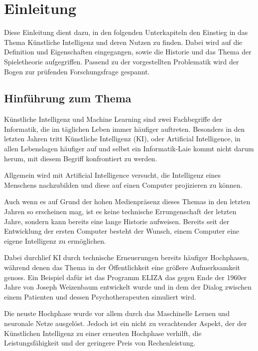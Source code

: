 
\chapter{Einleitung}
Diese Einleitung dient dazu, in den folgenden Unterkapiteln den Einstieg in das Thema Künstliche Intelligenz und deren Nutzen zu finden. Dabei wird auf die Definition und Eigenschaften eingegangen, sowie die Historie und das Thema der Spieletheorie aufgegriffen. Passend zu der vorgestellten Problematik wird der Bogen zur prüfenden Forschungsfrage gespannt.

\section{Hinführung zum Thema}
Künstliche Intelligenz und Machine Learning sind zwei Fachbegriffe der Informatik, die im täglichen Leben immer häufiger auftreten. Besonders in den letzten Jahren tritt Künstliche Intelligenz (\acs{KI}), oder Artificial Intelligence, in allen Lebenslagen häufiger auf und selbst ein Informatik-Laie kommt nicht darum herum, mit diesem Begriff konfrontiert zu werden. 

Allgemein wird mit Artificial Intelligence versucht, die Intelligenz eines Menschens nachzubilden und diese auf einen Computer projizieren zu können.

Auch wenn es auf Grund der hohen Medienpräsenz dieses Themas in den letzten Jahren so erscheinen mag, ist es keine technische Errungenschaft der letzten Jahre, sondern kann bereits eine lange Historie aufweisen. Bereits seit der Entwicklung der ersten Computer besteht der Wunsch, einem Computer eine eigene Intelligenz zu ermöglichen.

Dabei durchlief KI durch technische Erneuerungen bereits häufiger Hochphasen, während denen das Thema in der Öffentlichkeit eine größere Aufmerksamkeit genoss. Ein Beispiel dafür ist das Programm ELIZA das gegen Ende der 1960er Jahre von Joseph Weizenbaum entwickelt wurde und in dem der Dialog zwischen einem Patienten und dessen Psychotherapeuten simuliert wird.\cite{Weizenbaum1966}


Die neuste Hochphase wurde vor allem durch das Maschinelle Lernen und neuronale Netze ausgelöst. Jedoch ist ein nicht zu verachtender Aspekt, der der Künstlichen Intelligenz zu einer erneuten Hochphase verhilft, die Leistungsfähigkeit und der geringere Preis von Rechenleistung. 

